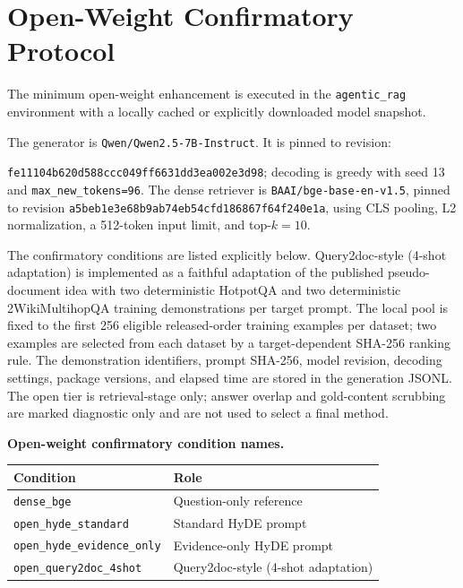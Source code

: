 \documentclass[pdflatex,sn-basic,Numbered]{sn-jnl}
\begin{document}
\FloatBarrier
\section{Open-Weight Confirmatory Protocol}
\label{supp:sec:open_weight_confirmatory_protocol}

The minimum open-weight enhancement is executed in the \texttt{agentic\_rag} environment with a locally cached or explicitly downloaded model snapshot.

The generator is \texttt{Qwen/Qwen2.5-7B-Instruct}.
It is pinned to revision:\par\noindent
{\scriptsize\texttt{fe11104b620d588ccc049ff6631dd3ea002e3d98}};
decoding is greedy with
seed 13 and \texttt{max\_new\_tokens=96}. The dense retriever is
\texttt{BAAI/bge-base-en-v1.5}, pinned to revision
\texttt{a5beb1e3e68b9ab74eb54cfd186867f64f240e1a}, using CLS pooling, L2
normalization, a 512-token input limit, and top-$k=10$.

The confirmatory conditions are listed explicitly below. Query2doc-style (4-shot adaptation) is implemented as a faithful adaptation of the published pseudo-document
idea with two deterministic HotpotQA and two deterministic 2WikiMultihopQA
training demonstrations per target prompt. The local pool is fixed to the first
256 eligible released-order training examples per dataset; two examples are
selected from each dataset by a target-dependent SHA-256 ranking rule. The
demonstration identifiers, prompt SHA-256, model revision, decoding settings, package versions, and elapsed time
are stored in the generation JSONL. The open tier is retrieval-stage only; answer
overlap and gold-content scrubbing are marked diagnostic only and are not used to
select a final method.

\begin{center}
\textbf{Open-weight confirmatory condition names.}\par\vspace{3pt}
\centering
\small
\begin{tabular}{ll}
\toprule
Condition & Role \\
\midrule
\texttt{dense\_bge} & Question-only reference \\
\texttt{open\_hyde\_standard} & Standard HyDE prompt \\
\texttt{open\_hyde\_evidence\_only} & Evidence-only HyDE prompt \\
\texttt{open\_query2doc\_4shot} & Query2doc-style (4-shot adaptation) \\
\bottomrule
\end{tabular}
\end{center}
\end{document}
